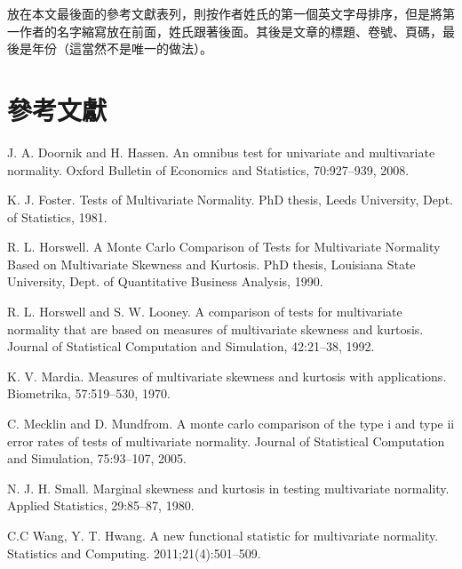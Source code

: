 \documentclass[12pt, a4paper]{article}
\begin{document}
放在本文最後面的參考文獻表列，則按作者姓氏的第一個英文字母排序，但是將第一作者的名字縮寫放在前面，姓氏跟著後面。其後是文章的標題、卷號、頁碼，最後是年份（這當然不是唯一的做法）。

\section*{參考文獻}

\begin{description}
\item J. A. Doornik and H. Hassen. An omnibus test for univariate and multivariate normality.
Oxford Bulletin of Economics and Statistics, 70:927–939, 2008.
\item K. J. Foster. Tests of Multivariate Normality. PhD thesis, Leeds University, Dept.
of Statistics, 1981.
\item R. L. Horswell. A Monte Carlo Comparison of Tests for Multivariate Normality
Based on Multivariate Skewness and Kurtosis. PhD thesis, Louisiana State University,
Dept. of Quantitative Business Analysis, 1990.
\item R. L. Horswell and S. W. Looney. A comparison of tests for multivariate normality
that are based on measures of multivariate skewness and kurtosis. Journal of
Statistical Computation and Simulation, 42:21–38, 1992.
\item K. V. Mardia. Measures of multivariate skewness and kurtosis with applications.
Biometrika, 57:519–530, 1970.
\item C. Mecklin and D. Mundfrom. A monte carlo comparison of the type i and type ii
error rates of tests of multivariate normality. Journal of Statistical Computation and
Simulation, 75:93–107, 2005.
\item N. J. H. Small. Marginal skewness and kurtosis in testing multivariate normality.
Applied Statistics, 29:85–87, 1980.
\item C.C Wang, Y. T. Hwang. A new functional statistic for multivariate normality. Statistics
and Computing. 2011;21(4):501–509.
\end{description}
\end{document}
